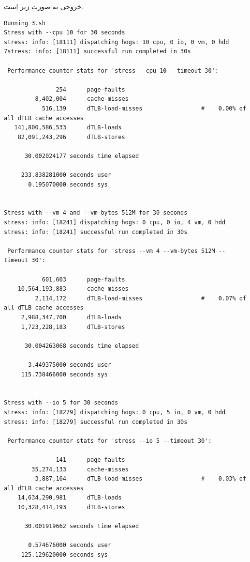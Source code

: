 \documentclass{article}
\begin{document}
خروجی به صورت زیر است. 
\begin{latin}
\begin{lstlisting}
Running 3.sh
Stress with --cpu 10 for 30 seconds
stress: info: [18111] dispatching hogs: 10 cpu, 0 io, 0 vm, 0 hdd
7stress: info: [18111] successful run completed in 30s

 Performance counter stats for 'stress --cpu 10 --timeout 30':

               254      page-faults                                                           
         8,402,004      cache-misses                                                          
           516,139      dTLB-load-misses                 #    0.00% of all dTLB cache accesses
   141,800,586,533      dTLB-loads                                                            
    82,091,243,296      dTLB-stores                                                           

      30.002024177 seconds time elapsed

     233.838281000 seconds user
       0.195070000 seconds sys


Stress with --vm 4 and --vm-bytes 512M for 30 seconds
stress: info: [18241] dispatching hogs: 0 cpu, 0 io, 4 vm, 0 hdd
stress: info: [18241] successful run completed in 30s

 Performance counter stats for 'stress --vm 4 --vm-bytes 512M --timeout 30':

           601,603      page-faults                                                           
    10,564,193,883      cache-misses                                                          
         2,114,172      dTLB-load-misses                 #    0.07% of all dTLB cache accesses
     2,988,347,700      dTLB-loads                                                            
     1,723,228,183      dTLB-stores                                                           

      30.004263068 seconds time elapsed

       3.449375000 seconds user
     115.738466000 seconds sys


Stress with --io 5 for 30 seconds
stress: info: [18279] dispatching hogs: 0 cpu, 5 io, 0 vm, 0 hdd
stress: info: [18279] successful run completed in 30s

 Performance counter stats for 'stress --io 5 --timeout 30':

               141      page-faults                                                           
        35,274,133      cache-misses                                                          
         3,887,164      dTLB-load-misses                 #    0.03% of all dTLB cache accesses
    14,634,290,981      dTLB-loads                                                            
    10,328,414,193      dTLB-stores                                                           

      30.001919662 seconds time elapsed

       0.574676000 seconds user
     125.129620000 seconds sys
\end{lstlisting}
\end{latin}
\end{document}
